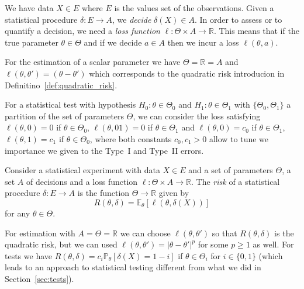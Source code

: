 \documentclass[
	fontsize=11pt, %
	twoside=false, %
	numbers=noenddot, %
]{kaobook}
\renewcommand{\P}{\mathbb P}
\newcommand{\E}{\mathbb E}
\newcommand{\R}{\mathbb R}
\newcommand{\go}{\rightarrow}
\begin{document}
We have data $X \in E$ where $E$ is the values set of the observations.
Given a statistical procedure $\delta : E \go A$, we \emph{decide} $\delta(X) \in A$.
In order to assess or to quantify a decision, we need a \emph{loss function} $\ell : \Theta \times A \go \R$.
This means that if the true parameter $\theta \in \Theta$ and if we decide $a \in A$ then we incur a loss $\ell(\theta, a)$.
\begin{example}
	For the estimation of a scalar parameter we have $\Theta = \R = A$ and $\ell(\theta, \theta') = (\theta - \theta')$ which corresponds to the quadratic risk introducion in Definitino~\ref{def:quadratic_risk}. 
\end{example}

\begin{example}
	For a statistical test with hypothesis $H_0 : \theta \in \Theta_0$ and $H_1 : \theta \in \Theta_1$ with $\{ \Theta_0, \Theta_1 \}$ a partition of the set of parameters $\Theta$, we can consider the loss satisfying $\ell(\theta, 0) = 0$ if $\theta \in \Theta_0$, $\ell(\theta, 01) = 0$ if $\theta \in \Theta_1$ and $\ell(\theta, 0) = c_0$ if $\theta \in \Theta_1$, $\ell(\theta, 1) = c_1$ if $\theta \in \Theta_0$, where both constants $c_0, c_1 > 0$ allow to tune we importance we given to the Type~I and Type~II errors.
\end{example}

\begin{definition}
	Consider a statistical experiment with data $X \in E$ and a set of parameters $\Theta$, a set $A$ of decisions and a loss function $\ell : \Theta \times A \go \R$. The \emph{risk} of a statistical procedure $\delta : E \go A$ is the function $\Theta \go \R$ given by
	\begin{equation*}
		R(\theta, \delta) = \E_\theta[ \ell(\theta, \delta(X))]
	\end{equation*}
	for any $\theta \in \Theta$.
\end{definition}

\begin{example}
	For estimation with $A = \Theta = \R$ we can choose $\ell(\theta, \theta')$ so that $R(\theta, \delta)$ is the quadratic risk, but we can used $\ell(\theta, \theta') = |\theta - \theta'|^p$ for some $p \geq 1$ as well. For tests we have $R(\theta, \delta) = c_i \P_\theta[\delta(X) = 1 - i]$ if $\theta \in \Theta_i$ for $i \in \{ 0, 1\}$ (which leads to an approach to statistical testing different from what we did in Section~\ref{sec:tests}).
\end{example}
\end{document}
